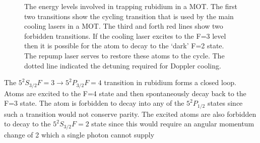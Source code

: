 \begin{figure}
\label{fig:energy_levels}
\centering
\hspace{10pt}
\caption[Title]{The energy levels involved in trapping rubidium in a MOT. The first two transitions show the cycling transition that is used by the main cooling lasers in a MOT. The third and forth red lines show two forbidden transitions. If the cooling laser excites to the F=3 level then it is possible for the atom to decay to the `dark' F=2 state. The repump laser serves to restore these atoms to the cycle. The dotted line indicated the detuning required for Doppler cooling.}
\label{fig:energy_level}
\end{figure}

The $5 ^2 S_{3/2} F=3\rightarrow5 ^2 P_{3/2} F=4$ transition in rubidium forms a closed loop. Atoms are excited to the F=4 state and then spontaneously decay back to the F=3 state. The atom is forbidden to decay into any of the $5 ^2 P_{1/2}$ states since such a transition would not conserve parity. The excited atoms are also forbidden to decay to the $5 ^2 S_{3/2} F=2$ state since this would require an angular momentum change of 2 which a single photon cannot supply

